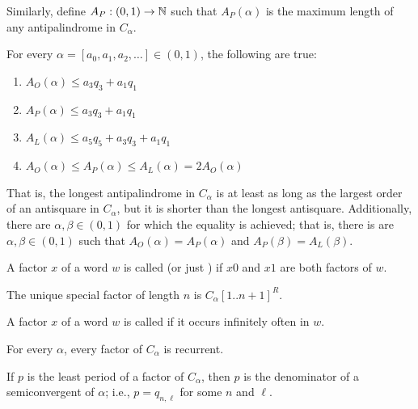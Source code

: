 \documentclass[a4paper,usenames,dvipsnames]{article}
\begin{document}
Similarly, define $A_P : (0, 1) \to \mathbb{N}$ such that $A_P(\alpha)$ is the maximum length of any antipalindrome in $C_{\alpha}$.

\begin{theorem}
    For every $\alpha = [a_0, a_1, a_2, \ldots] \in (0,1)$, the following are true:
    \begin{enumerate}[label=(\roman*)]
        \item $A_O(\alpha) \leq a_3 q_3 + a_1 q_1$
        \item $A_P(\alpha) \leq a_3 q_3 + a_1 q_1$ 
        \item $A_L(\alpha) \leq a_5 q_5 + a_3 q_3 + a_1 q_1$
        \item $A_O(\alpha) \leq A_P(\alpha) \leq A_L(\alpha) = 2A_O(\alpha)$
    \end{enumerate}
    
    That is, the longest antipalindrome in $C_{\alpha}$ is at least as long as the largest order of an antisquare in $C_{\alpha}$, but it is shorter than the longest antisquare.
    Additionally, there are $\alpha, \beta \in (0, 1)$ for which the equality is achieved; that is, there is are $\alpha, \beta \in (0, 1)$ such that $A_O(\alpha) = A_P(\alpha)$ and $A_P(\beta) = A_L(\beta)$.
\end{theorem}

\begin{definition}
    A factor $x$ of a word $w$ is called  (or just ) if $x0$ and $x1$ are both factors of $w$.
\end{definition}

\begin{theorem}
    The unique special factor of length $n$ is $C_{\alpha}[1..n+1]^R$.
\end{theorem}

\begin{definition}
    A factor $x$ of a word $w$ is called  if it occurs infinitely often in $w$.
\end{definition}

\begin{theorem}
    For every $\alpha$, every factor of $C_{\alpha}$ is recurrent.
\end{theorem}

\begin{theorem}\label{thm:lesat-period-semiconvergent}
    If $p$ is the least period of a factor of $C_{\alpha}$, then $p$ is the denominator of a semiconvergent of $\alpha$; i.e., $p = q_{n,\ell}$ for some $n$ and $\ell$.
\end{theorem}
\end{document}
